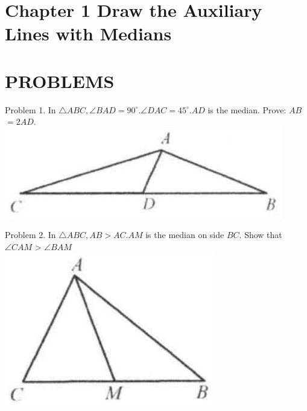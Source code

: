\documentclass[10pt]{article}
\begin{document}
\section*{Chapter 1 Draw the Auxiliary Lines with Medians}
\section*{PROBLEMS}
Problem 1. In \(\triangle A B C, \angle B A D=90^{\circ} . \angle D A C=45^{\circ} . A D\) is the median. Prove: \(A B\) \(=2 A D\).\\
\includegraphics[max width=\textwidth, center]{2025_04_17_97bc1f7e44d93c271a88g-027(3)}

Problem 2. In \(\triangle A B C, A B>A C . A M\) is the median on side \(B C\). Show that \(\angle C A M\) > \(\angle B A M\)\\
\includegraphics[max width=\textwidth, center]{2025_04_17_97bc1f7e44d93c271a88g-027}
\end{document}
